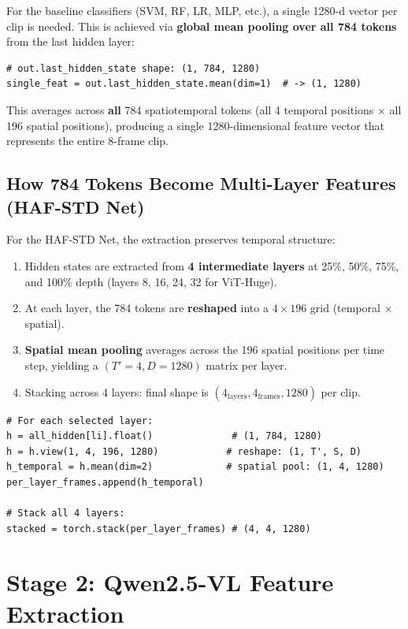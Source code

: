 \documentclass[a4paper, 12pt]{article}
\begin{document}
For the baseline classifiers (SVM, RF, LR, MLP, etc.), a single 1280-d vector per clip is needed. This is achieved via \textbf{global mean pooling over all 784 tokens} from the last hidden layer:

\begin{lstlisting}
# out.last_hidden_state shape: (1, 784, 1280)
single_feat = out.last_hidden_state.mean(dim=1)  # -> (1, 1280)
\end{lstlisting}

This averages across \textbf{all} 784 spatiotemporal tokens (all 4 temporal positions $\times$ all 196 spatial positions), producing a single 1280-dimensional feature vector that represents the entire 8-frame clip.

\subsection{How 784 Tokens Become Multi-Layer Features (HAF-STD Net)}

For the HAF-STD Net, the extraction preserves temporal structure:

\begin{enumerate}
    \item Hidden states are extracted from \textbf{4 intermediate layers} at 25\%, 50\%, 75\%, and 100\% depth (layers 8, 16, 24, 32 for ViT-Huge).
    \item At each layer, the 784 tokens are \textbf{reshaped} into a $4 \times 196$ grid (temporal $\times$ spatial).
    \item \textbf{Spatial mean pooling} averages across the 196 spatial positions per time step, yielding a $(T'=4, D=1280)$ matrix per layer.
    \item Stacking across 4 layers: final shape is $(4_\text{layers}, 4_\text{frames}, 1280)$ per clip.
\end{enumerate}

\begin{lstlisting}
# For each selected layer:
h = all_hidden[li].float()              # (1, 784, 1280)
h = h.view(1, 4, 196, 1280)            # reshape: (1, T', S, D)
h_temporal = h.mean(dim=2)             # spatial pool: (1, 4, 1280)
per_layer_frames.append(h_temporal)

# Stack all 4 layers:
stacked = torch.stack(per_layer_frames) # (4, 4, 1280)
\end{lstlisting}

\section{Stage 2: Qwen2.5-VL Feature Extraction}
\end{document}
